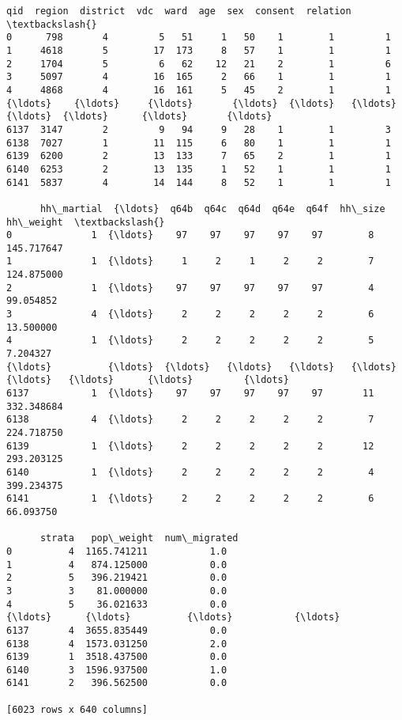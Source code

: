 \documentclass[11pt]{article}
\makeatletter
\newcommand{\boxspacing}{\kern\kvtcb@left@rule\kern\kvtcb@boxsep}
\newcommand{\prompt}[4]{
        {\ttfamily\llap{{\color{#2}[#3]:\hspace{3pt}#4}}\vspace{-\baselineskip}}
    }
\makeatother
\begin{document}
            \begin{tcolorbox}[breakable, size=fbox, boxrule=.5pt, pad at break*=1mm, opacityfill=0]
\prompt{Out}{outcolor}{7}{\boxspacing}
\begin{Verbatim}[commandchars=\\\{\}]
       qid  region  district  vdc  ward  age  sex  consent  relation  \textbackslash{}
0      798       4         5   51     1   50    1        1         1
1     4618       5        17  173     8   57    1        1         1
2     1704       5         6   62    12   21    2        1         6
3     5097       4        16  165     2   66    1        1         1
4     4868       4        16  161     5   45    2        1         1
{\ldots}    {\ldots}     {\ldots}       {\ldots}  {\ldots}   {\ldots}  {\ldots}  {\ldots}      {\ldots}       {\ldots}
6137  3147       2         9   94     9   28    1        1         3
6138  7027       1        11  115     6   80    1        1         1
6139  6200       2        13  133     7   65    2        1         1
6140  6253       2        13  135     1   52    1        1         1
6141  5837       4        14  144     8   52    1        1         1

      hh\_martial  {\ldots}  q64b  q64c  q64d  q64e  q64f  hh\_size   hh\_weight  \textbackslash{}
0              1  {\ldots}    97    97    97    97    97        8  145.717647
1              1  {\ldots}     1     2     1     2     2        7  124.875000
2              1  {\ldots}    97    97    97    97    97        4   99.054852
3              4  {\ldots}     2     2     2     2     2        6   13.500000
4              1  {\ldots}     2     2     2     2     2        5    7.204327
{\ldots}          {\ldots}  {\ldots}   {\ldots}   {\ldots}   {\ldots}   {\ldots}   {\ldots}      {\ldots}         {\ldots}
6137           1  {\ldots}    97    97    97    97    97       11  332.348684
6138           4  {\ldots}     2     2     2     2     2        7  224.718750
6139           1  {\ldots}     2     2     2     2     2       12  293.203125
6140           1  {\ldots}     2     2     2     2     2        4  399.234375
6141           1  {\ldots}     2     2     2     2     2        6   66.093750

      strata   pop\_weight  num\_migrated
0          4  1165.741211           1.0
1          4   874.125000           0.0
2          5   396.219421           0.0
3          3    81.000000           0.0
4          5    36.021633           0.0
{\ldots}      {\ldots}          {\ldots}           {\ldots}
6137       4  3655.835449           0.0
6138       4  1573.031250           2.0
6139       1  3518.437500           0.0
6140       3  1596.937500           1.0
6141       2   396.562500           0.0

[6023 rows x 640 columns]
\end{Verbatim}
\end{tcolorbox}
        
\end{document}

